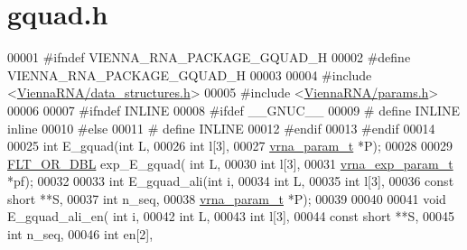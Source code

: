 \hypertarget{gquad_8h_source}{\section{gquad.\+h}
\label{gquad_8h_source}
}

\begin{DoxyCode}
00001 \textcolor{preprocessor}{#ifndef VIENNA\_RNA\_PACKAGE\_GQUAD\_H}
00002 \textcolor{preprocessor}{#define VIENNA\_RNA\_PACKAGE\_GQUAD\_H}
00003 
00004 \textcolor{preprocessor}{#include <\hyperlink{data__structures_8h}{ViennaRNA/data\_structures.h}>}
00005 \textcolor{preprocessor}{#include <\hyperlink{params_8h}{ViennaRNA/params.h}>}
00006 
00007 \textcolor{preprocessor}{#ifndef INLINE}
00008 \textcolor{preprocessor}{#ifdef \_\_GNUC\_\_}
00009 \textcolor{preprocessor}{# define INLINE inline}
00010 \textcolor{preprocessor}{#else}
00011 \textcolor{preprocessor}{# define INLINE}
00012 \textcolor{preprocessor}{#endif}
00013 \textcolor{preprocessor}{#endif}
00014 
00025 \textcolor{keywordtype}{int}         E\_gquad(\textcolor{keywordtype}{int} L,
00026                     \textcolor{keywordtype}{int} l[3],
00027                     \hyperlink{group__energy__parameters_structvrna__param__s}{vrna\_param\_t} *P);
00028 
00029 \hyperlink{group__data__structures_ga31125aeace516926bf7f251f759b6126}{FLT\_OR\_DBL} exp\_E\_gquad( \textcolor{keywordtype}{int} L,
00030                         \textcolor{keywordtype}{int} l[3],
00031                         \hyperlink{group__energy__parameters_structvrna__exp__param__s}{vrna\_exp\_param\_t} *pf);
00032 
00033 \textcolor{keywordtype}{int}         E\_gquad\_ali(\textcolor{keywordtype}{int} i,
00034                         \textcolor{keywordtype}{int} L,
00035                         \textcolor{keywordtype}{int} l[3],
00036                         \textcolor{keyword}{const} \textcolor{keywordtype}{short} **S,
00037                         \textcolor{keywordtype}{int} n\_seq,
00038                         \hyperlink{group__energy__parameters_structvrna__param__s}{vrna\_param\_t} *P);
00039 
00040 
00041 \textcolor{keywordtype}{void}        E\_gquad\_ali\_en( \textcolor{keywordtype}{int} i,
00042                             \textcolor{keywordtype}{int} L,
00043                             \textcolor{keywordtype}{int} l[3],
00044                             \textcolor{keyword}{const} \textcolor{keywordtype}{short} **S,
00045                             \textcolor{keywordtype}{int} n\_seq,
00046                             \textcolor{keywordtype}{int} en[2],

\end{DoxyCode}
